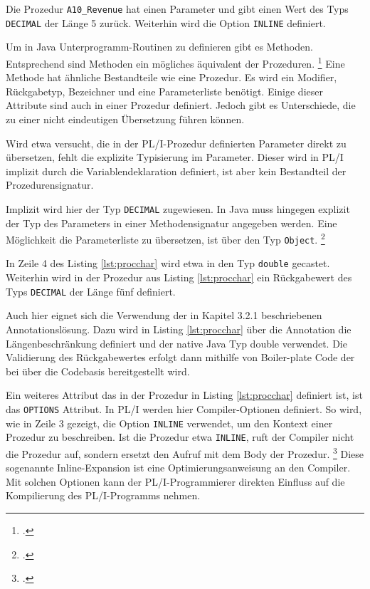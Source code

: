 Die Prozedur \verb+A10_Revenue+ hat einen Parameter und gibt einen Wert des Typs \verb+DECIMAL+ der L\"ange 5 zur\"uck.
Weiterhin wird die Option \verb+INLINE+ definiert.

Um in Java Unterprogramm-Routinen zu definieren gibt es Methoden. 
Entsprechend sind Methoden ein mögliches äquivalent der Prozeduren. \footcite[Vgl. ][]{oracle}
Eine Methode hat ähnliche Bestandteile wie eine Prozedur.
Es wird ein Modifier, Rückgabetyp, Bezeichner und eine Parameterliste benötigt.
Einige dieser Attribute sind auch in einer Prozedur definiert.
Jedoch gibt es Unterschiede, die zu einer nicht eindeutigen Übersetzung führen können.

Wird etwa versucht, die in der PL/I-Prozedur definierten Parameter direkt zu übersetzen, fehlt die explizite Typisierung im Parameter. Dieser wird in PL/I implizit durch die Variablendeklaration definiert,
ist aber kein Bestandteil der Prozedurensignatur. 

Implizit wird hier der Typ \verb+DECIMAL+ zugewiesen. 
In Java muss hingegen explizit der Typ des Parameters in einer Methodensignatur angegeben werden.
Eine M\"oglichkeit die Parameterliste zu übersetzen, ist über den Typ \verb+Object+. \footcite[Vgl. ][]{objectdocs}

In Zeile 4 des Listing \ref{lst:procchar} wird etwa in den Typ \verb+double+ gecastet. Weiterhin wird in der Prozedur aus Listing \ref{lst:procchar} ein R\"uckgabewert des Typs \verb+DECIMAL+ der L\"ange f\"unf definiert.

Auch hier eignet sich die Verwendung der in Kapitel 3.2.1 beschriebenen Annotationslösung. Dazu wird in Listing \ref{lst:procchar} über die Annotation die Längenbeschränkung definiert und der native Java Typ double verwendet.
Die Validierung des Rückgabewertes erfolgt dann mithilfe von Boiler-plate Code der bei über die Codebasis bereitgestellt wird.

Ein weiteres Attribut das in der Prozedur in Listing \ref{lst:procchar} definiert ist, ist das \verb+OPTIONS+
Attribut.
In PL/I werden hier Compiler-Optionen definiert. So wird, wie in Zeile 3 gezeigt, die Option \verb+INLINE+ verwendet, um den Kontext einer Prozedur zu beschreiben. Ist die Prozedur etwa \verb+INLINE+, ruft der Compiler nicht die Prozedur auf, sondern ersetzt den Aufruf mit dem Body der Prozedur. \footcite[Vgl.][]{optionsstmt} Diese sogenannte Inline-Expansion ist eine Optimierungsanweisung an den Compiler. Mit solchen Optionen kann der PL/I-Programmierer direkten Einfluss auf die Kompilierung des PL/I-Programms nehmen.

